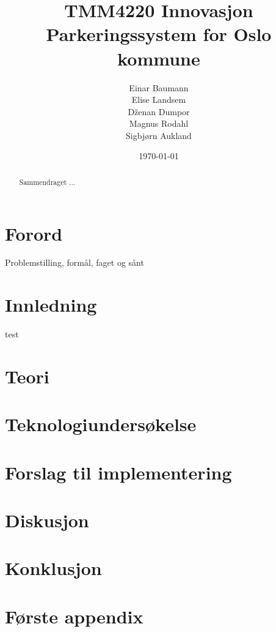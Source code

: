 \documentclass[a4paper, norsk, 12pt]{article}
\title{TMM4220 Innovasjon \\ 
\vspace{6pt}\large Parkeringssystem for Oslo kommune \\ \vspace{50pt} 
 }
\author{Einar Baumann \\Elise Landsem\\D\v{z}enan Dumpor\\Magnus Rodahl\\Sigbjørn Aukland}
\date{\today}
\theoremstyle{remark}
\begin{document}
\maketitle
\thispagestyle{empty}
\vspace{50pt}
\begin{abstract}
Sammendraget ...
\end{abstract}
\pagebreak

\tableofcontents
\pagebreak

\section*{Forord}
Problemstilling, formål, faget og sånt
\pagebreak



\section{Innledning}
\label{sec:innledning}
test




\section{Teori}
\label{sec:teori}






\section{Teknologiundersøkelse}
\label{sec:teknologi}






\section{Forslag til implementering}
\label{sec:implementering}






\section{Diskusjon}
\label{sec:diskusjon}







\section{Konklusjon}
\label{sec:konklusjon}







\pagebreak
{}

\pagebreak




\appendix

\section{Første appendix}
\label{sec:}

\end{document}
